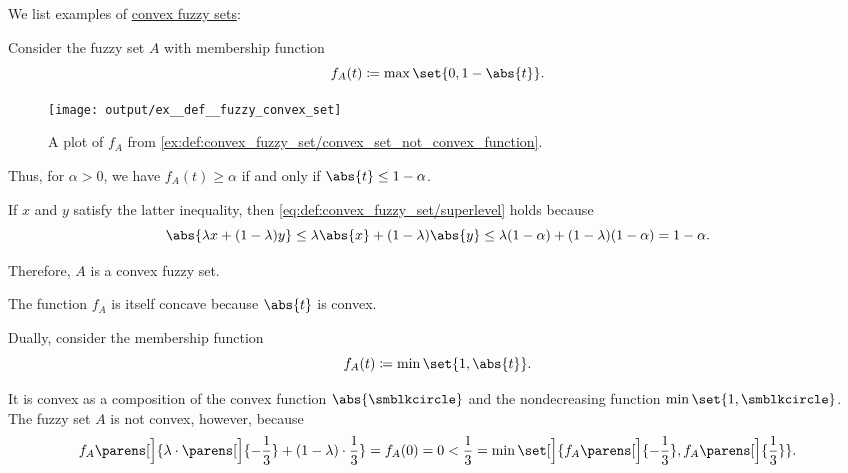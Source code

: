 \begin{example}\label{ex:def:convex_fuzzy_set}
  We list examples of \hyperref[def:convex_fuzzy_set]{convex fuzzy sets}:
  \begin{thmenum}
     Consider the fuzzy set \( A \) with membership function
    \begin{equation*}
      f_A(t) \coloneqq \max\set{ 0, 1 - \abs{t} }.
    \end{equation*}

    \begin{figure}[!ht]
      \centering
      \texttt{[image: output/ex\_\_def\_\_fuzzy\_convex\_set]}
      \caption{A plot of \( f_A \) from \cref{ex:def:convex_fuzzy_set/convex_set_not_convex_function}.}\label{fig:ex:def:convex_fuzzy_set/convex_set_not_convex_function}
    \end{figure}

    Thus, for \( \alpha > 0 \), we have \( f_A(t) \geq \alpha \) if and only if \( \abs{t} \leq 1 - \alpha \).

    If \( x \) and \( y \) satisfy the latter inequality, then \eqref{eq:def:convex_fuzzy_set/superlevel} holds because
    \begin{equation*}
      \abs{\lambda x + (1 - \lambda) y}
      \leq
      \lambda \abs{x} + (1 - \lambda) \abs{y}
      \leq
      \lambda (1 - \alpha) + (1 - \lambda) (1 - \alpha)
      =
      1 - \alpha.
    \end{equation*}

    Therefore, \( A \) is a convex fuzzy set.

    The function \( f_A \) is itself concave because \( \abs{t} \) is convex.

     Dually, consider the membership function
    \begin{equation*}
      f_A(t) \coloneqq \min\set{ 1, \abs{t} }.
    \end{equation*}

    It is convex as a composition of the convex function \( \abs{ \anon } \) and the nondecreasing function \( \min\set{ 1, \anon } \). The fuzzy set \( A \) is not convex, however, because
    \begin{equation*}
      f_A\parens[\Big]{ \lambda \cdot \parens[\Big]{ - \frac 1 3 } + (1 - \lambda) \cdot \frac 1 3 }
      =
      f_A(0)
      =
      0
      <
      \frac 1 3
      =
      \min\set[\Big]{ f_A\parens[\Big]{ -\frac 1 3 }, f_A\parens[\Big]{ \frac 1 3 } }.
    \end{equation*}
  \end{thmenum}
\end{example}

